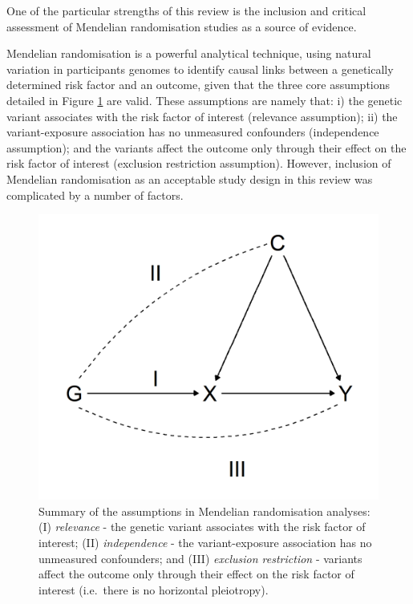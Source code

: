 \documentclass[a4paper, twoside]{templates/ociamthesis}
\begin{document}
One of the particular strengths of this review is the inclusion and critical assessment of Mendelian randomisation studies as a source of evidence.

Mendelian randomisation is a powerful analytical technique, using natural variation in participants genomes to identify causal links between a genetically determined risk factor and an outcome, given that the three core assumptions detailed in Figure \ref{fig:mrAssumptions} are valid. These assumptions are namely that: i) the genetic variant associates with the risk factor of interest (relevance assumption); ii) the variant-exposure association has no unmeasured confounders (independence assumption); and the variants affect the outcome only through their effect on the risk factor of interest (exclusion restriction assumption). However, inclusion of Mendelian randomisation as an acceptable study design in this review was complicated by a number of factors.





\begin{figure}[H]

{\centering \includegraphics[width=0.7\linewidth]{figures/sys-rev/mrAssumptions} 

}

\caption[Overview of assumptions in Mendelian randomisation analyses]{Summary of the assumptions in Mendelian randomisation analyses: (I) \emph{relevance} - the genetic variant associates with the risk factor of interest; (II) \emph{independence} - the variant-exposure association has no unmeasured confounders; and (III) \emph{exclusion restriction} - variants affect the outcome only through their effect on the risk factor of interest (i.e.~there is no horizontal pleiotropy).}\label{fig:mrAssumptions}
\end{figure}
\end{document}

